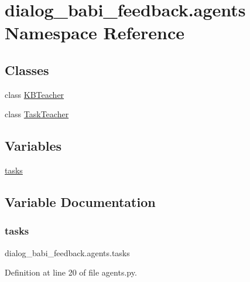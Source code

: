 \hypertarget{namespacedialog__babi__feedback_1_1agents}{}\section{dialog\+\_\+babi\+\_\+feedback.\+agents Namespace Reference}
\label{namespacedialog__babi__feedback_1_1agents}
\subsection*{Classes}
\begin{DoxyCompactItemize}
\item 
class \hyperlink{classdialog__babi__feedback_1_1agents_1_1KBTeacher}{K\+B\+Teacher}
\item 
class \hyperlink{classdialog__babi__feedback_1_1agents_1_1TaskTeacher}{Task\+Teacher}
\end{DoxyCompactItemize}
\subsection*{Variables}
\begin{DoxyCompactItemize}
\item 
\hyperlink{namespacedialog__babi__feedback_1_1agents_a7d33eaaad5810ba8c8719d3d64410e8b}{tasks}
\end{DoxyCompactItemize}


\subsection{Variable Documentation}
\mbox{\label{namespacedialog__babi__feedback_1_1agents_a7d33eaaad5810ba8c8719d3d64410e8b}} 
\subsubsection{\texorpdfstring{tasks}{tasks}}
{\footnotesize\ttfamily dialog\+\_\+babi\+\_\+feedback.\+agents.\+tasks}



Definition at line 20 of file agents.\+py.

